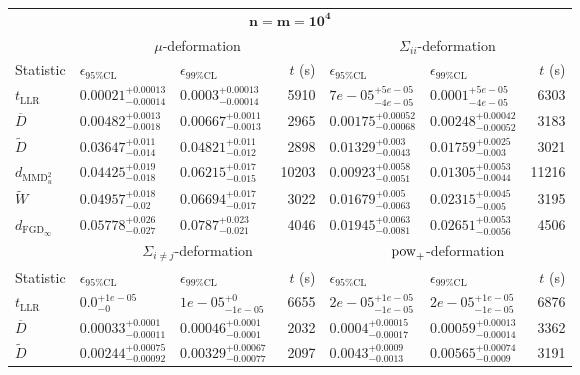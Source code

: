 \begin{tabular}{l|llr|llr}
	\toprule
	\multicolumn{7}{c}{$\mathbf{n=m=10^{4}}$} \\
	\multicolumn{1}{c}{} & \multicolumn{3}{c}{$\mu$-deformation} & \multicolumn{3}{c}{$\Sigma_{ii}$-deformation} \\
	Statistic & $\epsilon_{95\%\mathrm{CL}}$ & $\epsilon_{99\%\mathrm{CL}}$ & $t$ (s) & $\epsilon_{95\%\mathrm{CL}}$ & $\epsilon_{99\%\mathrm{CL}}$ & $t$ (s) \\
	\midrule
	$t_{\mathrm{LLR}}$ & $0.00021_{-0.00014}^{+0.00013}$ & $0.0003_{-0.00014}^{+0.00013}$ & 5910 & $7e-05_{-4e-05}^{+5e-05}$ & $0.0001_{-4e-05}^{+5e-05}$ & 6303 \\
	$\overline{D}$ & $0.00482_{-0.0018}^{+0.0013}$ & $0.00667_{-0.0013}^{+0.0011}$ & 2965 & $0.00175_{-0.00068}^{+0.00052}$ & $0.00248_{-0.00052}^{+0.00042}$ & 3183 \\
	$\widetilde{D}$ & $0.03647_{-0.014}^{+0.011}$ & $0.04821_{-0.012}^{+0.011}$ & 2898 & $0.01329_{-0.0043}^{+0.003}$ & $0.01759_{-0.003}^{+0.0025}$ & 3021 \\
	$d_{\mathrm{MMD}^{2}_{u}}$ & $0.04425_{-0.018}^{+0.019}$ & $0.06215_{-0.015}^{+0.017}$ & 10203 & $0.00923_{-0.0051}^{+0.0058}$ & $0.01305_{-0.0044}^{+0.0053}$ & 11216 \\
	$\widetilde{W}$ & $0.04957_{-0.02}^{+0.018}$ & $0.06694_{-0.017}^{+0.017}$ & 3022 & $0.01679_{-0.0063}^{+0.005}$ & $0.02315_{-0.005}^{+0.0045}$ & 3195 \\
	$d_{\mathrm{FGD}_{\infty}}$ & $0.05778_{-0.027}^{+0.026}$ & $0.0787_{-0.021}^{+0.023}$ & 4046 & $0.01945_{-0.0081}^{+0.0063}$ & $0.02651_{-0.0056}^{+0.0053}$ & 4506 \\
	\toprule
	\multicolumn{1}{c}{} & \multicolumn{3}{c}{$\Sigma_{i\neq j}$-deformation} & \multicolumn{3}{c}{$\rm{pow}_{+}$-deformation} \\
	Statistic & $\epsilon_{95\%\mathrm{CL}}$ & $\epsilon_{99\%\mathrm{CL}}$ & $t$ (s) & $\epsilon_{95\%\mathrm{CL}}$ & $\epsilon_{99\%\mathrm{CL}}$ & $t$ (s) \\
	\midrule
	$t_{\mathrm{LLR}}$ & $0.0_{-0}^{+1e-05}$ & $1e-05_{-1e-05}^{+0}$ & 6655 & $2e-05_{-1e-05}^{+1e-05}$ & $2e-05_{-1e-05}^{+1e-05}$ & 6876 \\
	$\overline{D}$ & $0.00033_{-0.00011}^{+0.0001}$ & $0.00046_{-0.0001}^{+0.0001}$ & 2032 & $0.0004_{-0.00017}^{+0.00015}$ & $0.00059_{-0.00014}^{+0.00013}$ & 3362 \\
	$\widetilde{D}$ & $0.00244_{-0.00092}^{+0.00075}$ & $0.00329_{-0.00077}^{+0.00067}$ & 2097 & $0.0043_{-0.0013}^{+0.0009}$ & $0.00565_{-0.0009}^{+0.00074}$ & 3191 \\

\end{tabular}
